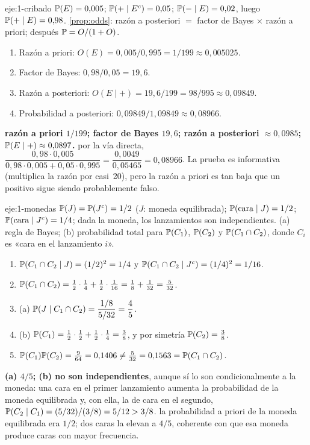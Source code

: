 \begin{solucion}{eje:1-cribado}
\datos $\mathbb{P}(E)=0{,}005$; $\mathbb{P}(+\mid E^{c})=0{,}05$; $\mathbb{P}(-\mid E)=0{,}02$, luego $\mathbb{P}(+\mid E)=0{,}98$.
\planteamiento \cref{prop:odds}: razón a posteriori $=$ factor de Bayes $\times$ razón a priori; después $\mathbb{P}=O/(1+O)$.
\pasos
\begin{enumerate}[label=\arabic*.]
  \item Razón a priori: $O(E)=0{,}005/0{,}995=1/199\approx 0{,}005025$.
  \item Factor de Bayes: $0{,}98/0{,}05=19{,}6$.
  \item Razón a posteriori: $O(E\mid +)=19{,}6/199=98/995\approx 0{,}09849$.
  \item Probabilidad a posteriori: $0{,}09849/1{,}09849\approx 0{,}08966$.
\end{enumerate}
\resultado \textbf{razón a priori $1/199$; factor de Bayes $19{,}6$; razón a posteriori $\approx 0{,}0985$; $\mathbb{P}(E\mid +)\approx 0{,}0897$.}
\comprobacion por la vía directa, $\dfrac{0{,}98\cdot 0{,}005}{0{,}98\cdot 0{,}005+0{,}05\cdot 0{,}995}=\dfrac{0{,}0049}{0{,}05465}=0{,}08966$. La prueba es informativa (multiplica la razón por casi~20), pero la razón a priori es tan baja que un positivo sigue siendo probablemente falso.
\end{solucion}

\begin{solucion}{eje:1-monedas}
\datos $\mathbb{P}(J)=\mathbb{P}(J^{c})=1/2$ ($J$: moneda equilibrada); $\mathbb{P}(\text{cara}\mid J)=1/2$; $\mathbb{P}(\text{cara}\mid J^{c})=1/4$; dada la moneda, los lanzamientos son independientes.
\planteamiento (a) regla de Bayes; (b) probabilidad total para $\mathbb{P}(C_1)$, $\mathbb{P}(C_2)$ y $\mathbb{P}(C_1\cap C_2)$, donde $C_i$ es «cara en el lanzamiento $i$».
\pasos
\begin{enumerate}[label=\arabic*.]
  \item $\mathbb{P}(C_1\cap C_2\mid J)=(1/2)^{2}=1/4$ y $\mathbb{P}(C_1\cap C_2\mid J^{c})=(1/4)^{2}=1/16$.
  \item $\mathbb{P}(C_1\cap C_2)=\frac12\cdot\frac14+\frac12\cdot\frac1{16}=\frac18+\frac1{32}=\frac{5}{32}$.
  \item (a) $\mathbb{P}(J\mid C_1\cap C_2)=\dfrac{1/8}{5/32}=\dfrac{4}{5}$.
  \item (b) $\mathbb{P}(C_1)=\frac12\cdot\frac12+\frac12\cdot\frac14=\frac38$, y por simetría $\mathbb{P}(C_2)=\frac38$.
  \item $\mathbb{P}(C_1)\mathbb{P}(C_2)=\frac{9}{64}=0{,}1406\ne\frac{5}{32}=0{,}1563=\mathbb{P}(C_1\cap C_2)$.
\end{enumerate}
\resultado \textbf{(a) $4/5$; (b) no son independientes}, aunque sí lo son condicionalmente a la moneda: una cara en el primer lanzamiento aumenta la probabilidad de la moneda equilibrada y, con ella, la de cara en el segundo, $\mathbb{P}(C_2\mid C_1)=(5/32)/(3/8)=5/12>3/8$.
\comprobacion la probabilidad a priori de la moneda equilibrada era $1/2$; dos caras la elevan a $4/5$, coherente con que esa moneda produce caras con mayor frecuencia.
\end{solucion}

